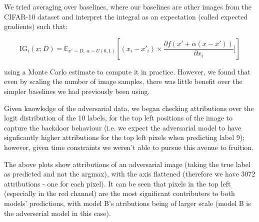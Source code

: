 \documentclass[letterpaper]{article} %
\begin{document}
We tried averaging over baselines, where our baselines are other images from the CIFAR-10 dataset and interpret the integral as an expectation (called expected gradients) such that:

$$\text{IG}_i(x; D) = \mathbb{E}_{x' \sim D, \ \alpha \sim U(0,1)} \left[ (x_i - x'_i) \times \frac{\partial f(x' + \alpha(x-x'))}{\partial x_i}] \right]$$

using a Monte Carlo estimate to compute it in practice. However, we found that even by scaling the number of image samples, there was little benefit over the simpler baselines we had previously been using.

Given knowledge of the adversarial data, we began checking attributions over the logit distribution of the 10 labels, for the top left positions of the image to capture the backdoor behaviour (i.e. we expect the adversarial model to have signficantly higher attributions for the top left pixels when predicting label 9); however, given time constraints we weren't able to pursue this avenue to fruition.

The above plots show attributions of an adversarial image (taking the true label as predicted and not the argmax), with the axis flattened (therefore we have 3072 attributions - one for each pixel). It can be seen that pixels in the top left (especially in the red channel) are the most significant contributers to both models' predictions, with model B's atributions being of larger scale (model B is the adverserial model in this case).
\end{document}
